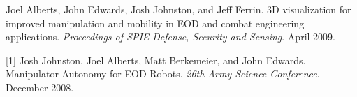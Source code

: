 \documentclass[margin,line]{res}
\newcommand{\pubunder}[1]{#1}
\newcommand{\cnum}[1]{[#1]}
\begin{document}
\begin{resume}
\cnum{2} Joel Alberts, \pubunder{John Edwards}, Josh Johnston, and Jeff Ferrin. 3D visualization for improved manipulation and mobility in EOD and combat engineering applications. \textit{Proceedings of SPIE Defense, Security and Sensing}. April 2009.

\cnum{1} Josh Johnston, Joel Alberts, Matt Berkemeier, and \pubunder{John Edwards}. Manipulator Autonomy for EOD Robots. \textit{26th Army Science Conference}. December 2008.











\end{resume}
\end{document}
